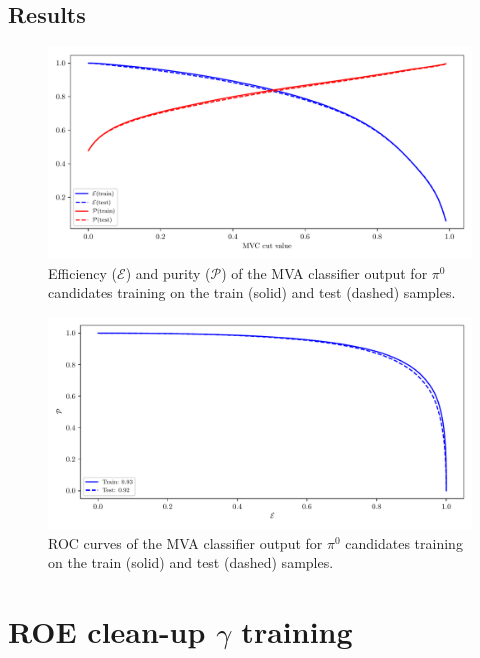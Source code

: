 \subsection*{Results}

\begin{figure}[H]
\centering
\captionsetup{width=0.8\linewidth}
\includegraphics[width=\linewidth]{fig/addendums/pi0_effpur}
\caption{Efficiency ($\mathcal{E}$) and purity ($\mathcal{P}$) of the MVA classifier output for $\pi^0$ candidates training on the train (solid) and test (dashed) samples.}
\end{figure}

\begin{figure}[H]
\centering
\captionsetup{width=0.8\linewidth}
\includegraphics[width=\linewidth]{fig/addendums/pi0_roc}
\caption{ROC curves of the MVA classifier output for $\pi^0$ candidates training on the train (solid) and test (dashed) samples.}
\end{figure}

\section*{ROE clean-up $\gamma$ training}\label{sec:ROE_gamma}

